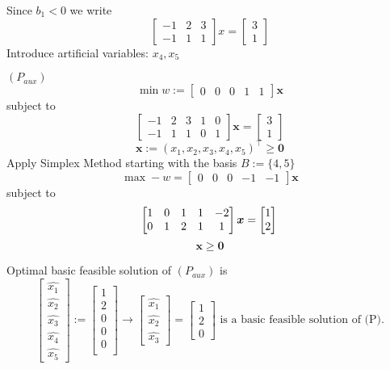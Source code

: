 Since $ b_1<0 $
we write
\[ \begin{bmatrix}
    -1 & 2 & 3\\
    -1 & 1 & 1
\end{bmatrix}
x=
\begin{bmatrix}
    3\\
    1
\end{bmatrix}
\]
Introduce artificial variables: $ x_4, x_5 $

$ (P_{aux}) $ 
\[\min w:=\begin{bmatrix} 0 & 0 & 0 & 1 & 1 \end{bmatrix} \bm{x} \]
subject to
\[
    \begin{bmatrix}
        -1 & 2 & 3 & 1 & 0\\
        -1 & 1 & 1 & 0 & 1
    \end{bmatrix}
    \bm{x}=
    \begin{bmatrix}
        3\\
        1
    \end{bmatrix}
\]
\[ \bm{x}:=(x_1,x_2,x_3,x_4,x_5)^\top \ge \bm{0} \]
Apply Simplex Method starting with the basis $ B:=\{4,5\} $
\[\max -w=\begin{bmatrix} 0 & 0 & 0 & -1 & -1 \end{bmatrix} \bm{x} \]
subject to
\[
    \begin{bmatrix}
        1 & 0 & 1 & 1 & -2\\
        0 & 1 & 2 & 1 & 1
    \end{bmatrix}
    \bm{x}=
    \begin{bmatrix}
        1\\
        2
    \end{bmatrix}\\
\]
\[ \bm{x}\ge \bm{0} \]


Optimal basic feasible solution of $ (P_{aux}) $ is
\[ 
    \begin{bmatrix}
        \hat{x_1}\\
        \hat{x_2}\\
        \hat{x_3}\\
        \hat{x_4}\\
        \hat{x_5}
    \end{bmatrix}
    :=
    \begin{bmatrix}
        1\\
        2\\
        0\\
        0\\
        0\\
    \end{bmatrix}
    \rightarrow
    \begin{bmatrix}
        \hat{x_1}\\
        \hat{x_2}\\
        \hat{x_3}
    \end{bmatrix}
    =
    \begin{bmatrix}
        1\\
        2\\
        0
    \end{bmatrix}
    \text{ is a basic feasible solution of (P).}
\]

